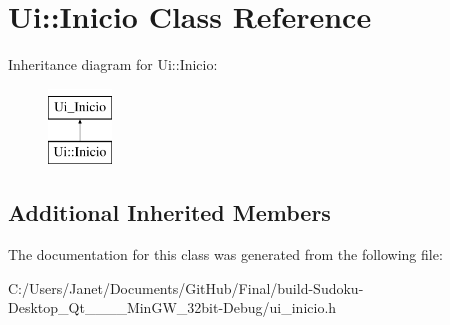 \hypertarget{class_ui_1_1_inicio}{\section{Ui\-:\-:Inicio Class Reference}
\label{class_ui_1_1_inicio}
}
Inheritance diagram for Ui\-:\-:Inicio\-:\begin{figure}[H]
\begin{center}
\leavevmode
\includegraphics[height=2.000000cm]{class_ui_1_1_inicio}
\end{center}
\end{figure}
\subsection*{Additional Inherited Members}


The documentation for this class was generated from the following file\-:\begin{DoxyCompactItemize}
\item 
C\-:/\-Users/\-Janet/\-Documents/\-Git\-Hub/\-Final/build-\/\-Sudoku-\/\-Desktop\-\_\-\-Qt\-\_\-\_\-\_\-\_\-\-Min\-G\-W\-\_\-32bit-\/\-Debug/ui\-\_\-inicio.\-h\end{DoxyCompactItemize}
